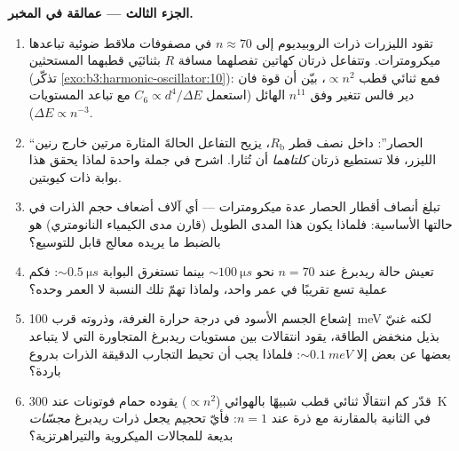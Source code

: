 \begin{problem}
\medskip\noindent\textbf{الجزء الثالث --- عمالقة في المخبر.}
\begin{enumerate}[resume]
  \item تقود الليزرات ذرات الروبيديوم إلى $n \approx 70$ في
        مصفوفات ملاقط ضوئية تباعدها ميكرومترات. وتتفاعل ذرتان
        كهاتين تفصلهما مسافة $R$ بثنائيَي قطبهما المستحثين
        (تذكّر \cref{exo:b3:harmonic-oscillator:10}): فمع ثنائي قطب
        $\propto n^2$، بيّن أن قوة فان دير فالس تتغير وفق
        $n^{11}$ الهائل (استعمل $C_6 \propto d^4/\Delta E$ مع
        تباعد المستويات $\Delta E \propto n^{-3}$).
  \item ``الحصار'': داخل نصف قطر $R_{\text{b}}$، يزيح
        التفاعل الحالةَ المثارة مرتين خارج رنين الليزر،
        فلا تستطيع ذرتان \emph{كلتاهما} أن تُثارا.
        اشرح في جملة واحدة لماذا يحقق هذا بوابة ذات كيوبتين.
  \item تبلغ أنصاف أقطار الحصار عدة ميكرومترات --- أي آلاف
        أضعاف حجم الذرات في حالتها الأساسية: فلماذا يكون هذا
        المدى الطويل (قارن مدى الكيمياء النانومتري)
        هو بالضبط ما يريده معالج قابل للتوسيع؟
  \item تعيش حالة ريدبرغ عند $n = 70$ نحو $\sim\qty{100}{\micro s}$
        بينما تستغرق البوابة $\sim\qty{0.5}{\micro s}$: فكم عملية
        تسع تقريبًا في عمر واحد، ولماذا تهمّ تلك
        النسبة لا العمر وحده؟
  \item إشعاع الجسم الأسود في درجة حرارة الغرفة، وذروته قرب
        \qty{100}{meV} لكنه غنيّ بذيل منخفض الطاقة، يقود
        انتقالات بين مستويات ريدبرغ المتجاورة التي لا يتباعد بعضها عن بعض إلا
        $\sim\qty{0.1}{meV}$: فلماذا يجب أن تحيط التجارب الدقيقة الذرات بدروع باردة؟
  \item قدّر كم انتقالًا ثنائي قطب شبيهًا بالهوائي
        ($\propto n^2$) يقوده حمام فوتونات عند \qty{300}{K} في
        الثانية بالمقارنة مع ذرة عند $n = 1$: فأيّ تحجيم يجعل
        ذرات ريدبرغ \emph{مجسّات} بديعة للمجالات الميكروية
        والتيراهرتزية؟
\end{enumerate}


\end{problem}
